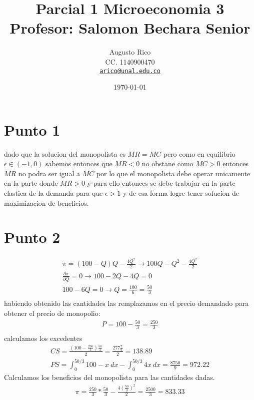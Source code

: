 \documentclass[11pt]{article}
\title{Parcial 1 Microeconomia 3\\
    \large Profesor: Salomon Bechara Senior
}
\author{Augusto Rico\\CC. 1140900470\\
    \href{mailto:arico@unal.edu.co}{\texttt{arico@unal.edu.co}}
    }
\date{\today}
\begin{document}
\maketitle



\section{Punto 1}
\begin{flushleft} 
    dado que la solucion del monopolista es $MR=MC$ pero como en equilibrio $\epsilon\in(-1,0)$ sabemos entonces que 
    $MR<0$ no obstane como $MC>0$ entonces $MR$ no podra ser igual a $MC$ por lo que el
    monopolista debe operar unicamente en la parte donde $MR>0$ y para ello entonces se debe trabajar en la parte elastica de la demanda
    para que $\epsilon>1$ y de esa forma logre tener solucion de maximizacion de beneficios. 
\end{flushleft}

\section{Punto 2}
\begin{flushleft}    
    \begin{align*}
        \pi = (100-Q)Q-\frac{4Q^2}{2} \to 100Q-Q^2-\frac{4Q^2}{2}\\
        \frac{\partial \pi}{\partial Q} = 0 \to 100-2Q-4Q=0\\ 100-6Q=0 \to Q=\frac{100}{6}=\frac{50}{3}\\
    \end{align*}
    habiendo obtenido las cantidades las remplazamos en el precio demandado para obtener el precio de monopolio:
    \begin{align*}
        P=100-\frac{50}{3}=\frac{250}{3}\\
    \end{align*}
    calculamos los excedentes
    \begin{align*}
        CS=\frac{\left(100-\frac{250}{3}\right)\frac{50}{3}}{2}=\frac{277\frac{7}{9}}{2}=138.89\\
        PS=\int_{0}^{50/3}100-x~dx - \int_{0}^{50/3} 4x ~dx = \frac{8750}{9} = 972.22
    \end{align*}
    Calculamos los beneficios del monopolista para las cantidades dadas.
    \begin{align*}
        \pi = \frac{250}{3}*\frac{50}{3}-\frac{4\left(\frac{50}{3}\right)^2}{2}=\frac{2500}{3}=833.33
    \end{align*}
\end{flushleft}
\end{document}
